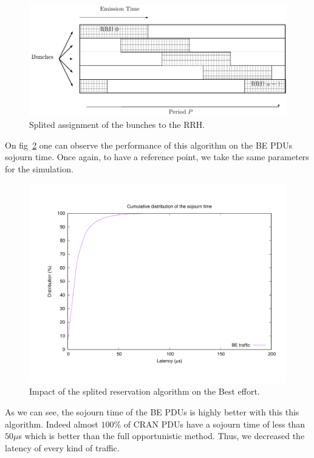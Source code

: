 \documentclass[]{algotel}
\begin{document}
   \begin{figure}[!h]
\centering
      \includegraphics[scale=0.7]{freqsplited.pdf}
     \caption{Splited assignment of the bunches to the RRH.}   \label{fig:freqS}
  \end{figure}
  
  On fig~\ref{fig:res2} one can observe the performance of this algorithm on the BE PDUs sojourn time. Once again, to have a reference point, we take the same parameters for the simulation. 

 \begin{figure}[h]
\centering
      \includegraphics[scale=0.4]{res2.pdf}
     \caption{Impact of the splited reservation algorithm on the Best effort.}   \label{fig:res2}
  \end{figure}
  
  As we can see, the sojourn time of the BE PDUs is highly better with this this algorithm. Indeed almost $100\%$ of CRAN PDUs have a sojourn time of less than $50\mu$s which is better than the full opportunistic method. Thus, we decreased the latency of every kind of traffic.
\end{document}
